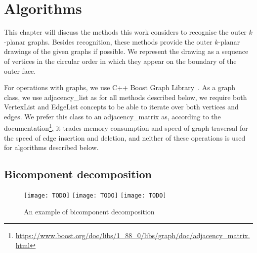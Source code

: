 \chapter{Algorithms}\label{ch:proposed-solution}

This chapter will discuss the methods this work considers to recognise the outer \(k\)-planar graphs. Besides recognition, these methods provide the outer \(k\)-planar drawings of the given graphs if possible. We represent the drawing as a sequence of vertices in the circular order in which they appear on the boundary of the outer face.

For operations with graphs, we use C++ Boost Graph Library~\cite{boost}. As a graph class, we use \textsf{adjacency\_list} as for all methods described below, we require both \textsf{VertexList} and \textsf{EdgeList} concepts to be able to iterate over both vertices and edges. We prefer this class to an \textsf{adjacency\_matrix} as, according to the documentation\footnote{\url{https://www.boost.org/doc/libs/1_88_0/libs/graph/doc/adjacency_matrix.html}}, it trades memory consumption and speed of graph traversal for the speed of edge insertion and deletion, and neither of these operations is used for algorithms described below.



\section{Bicomponent decomposition}

\begin{figure}[tbh]
    \centering
     {
        \texttt{[image: TODO]}
    }
    \hfill
     {
        \texttt{[image: TODO]}
    }
    \hfill
    \hfill
     {
        \texttt{[image: TODO]}
    }
    \caption{An example of bicomponent decomposition}
\end{figure}

